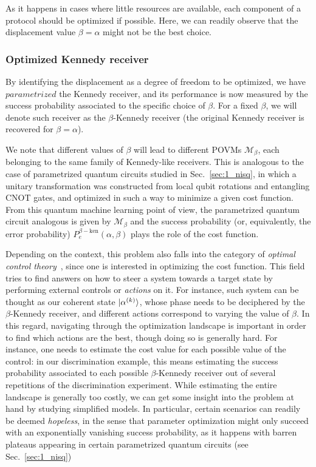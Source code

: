 As it happens in cases where little resources are available, each component of a protocol should be optimized if possible. Here, we can readily observe that the displacement value $\beta=\alpha$ might not be the best choice.

\subsubsection{Optimized Kennedy receiver}
By identifying the displacement as a degree of freedom to be optimized, we have $\textit{parametrized}$ the Kennedy receiver, and its performance is now measured by the success probability associated to the specific choice of $\beta$. For a fixed $\beta$, we will denote such receiver as the $\beta$-Kennedy receiver (the original Kennedy receiver is recovered for $\beta = \alpha$).

We note that different values of $\beta$ will lead to different POVMs $\mathcal{M}_\beta$, each belonging to the same family of Kennedy-like receivers. This is analogous to the case of parametrized quantum circuits studied in Sec.~\ref{sec:1_nisq}, in which a unitary transformation was constructed from local qubit rotations and entangling CNOT gates, and optimized in such a way to minimize a given cost function. From this quantum machine learning point of view, the parametrized quantum circuit analogous is given by $\mathcal{M}_\beta$ and the success probability (or, equivalently, the error probability) $P^{\beta-\text{ken}}_e(\alpha, \beta)$ plays the role of the cost function.

Depending on the context, this problem also falls into the category of \textit{optimal control theory}~\cite{Bell1964, Bert05}, since one is interested in optimizing the cost function. This field tries to find answers on how to steer a system towards a target state by performing external controls or \textit{actions} on it. For instance, such system can be thought as our coherent state $\ket{\alpha^{(k)}}$, whose phase needs to be deciphered by the $\beta$-Kennedy receiver, and different actions correspond to varying the value of $\beta$. In this regard, navigating through the optimization landscape is important in order to find which actions are the best, though doing so is generally hard. For instance, one needs to estimate the cost value for each possible value of the control: in our discrimination example, this means estimating the success probability associated to each possible $\beta$-Kennedy receiver out of several repetitions of the discrimination experiment. While estimating the entire landscape is generally too costly, we can get some insight into the problem at hand by studying simplified models. In particular, certain scenarios can readily be deemed \textit{hopeless}, in the sense that parameter optimization might only succeed with an exponentially vanishing success probability, as it happens with barren plateaus appearing in certain parametrized quantum circuits (see  Sec.~\ref{sec:1_nisq})

